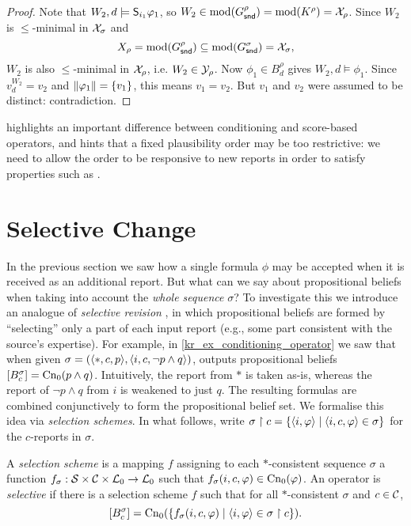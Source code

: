 \begin{proof}
    Note that $W_2, d \models \S_{i_1}{\phi_1}$, so $W_2 \in \mods(G^\rho_\snd)
    = \mods(K^\rho) = \X_\rho$. Since $W_2$ is $\le$-minimal in $\X_\sigma$ and
    \[
        X_\rho = \mods(G^\rho_\snd) \subseteq \mods(G^\sigma_\snd) = \X_\sigma,
    \]
    $W_2$ is also $\le$-minimal in $\X_\rho$, i.e. $W_2 \in \Y_\rho$. Now
    $\phi_1 \in B^\rho_d$ gives $W_2, d \models \phi_1$. Since $v^{W_2}_d =
    v_2$ and $\propmods{\phi_1} = \{v_1\}$, this means $v_1 = v_2$. But $v_1$
    and $v_2$ were assumed to be distinct: contradiction.

\end{proof}

 highlights an important
difference between conditioning and score-based operators, and hints that
a fixed plausibility order may be too restrictive: we
need to allow the order to be responsive to new reports in order to satisfy
properties such as \strongcondsucc{}.

\section{Selective Change}
\label{kr_sec_selective_change}

In the previous section we saw how a single formula $\phi$ may be accepted when
it is received as an additional report. But what can we say about propositional
beliefs when taking into account the \emph{whole sequence} $\sigma$? To
investigate this we introduce an analogue of \emph{selective revision}
\cite{ferme1999selective}, in which propositional beliefs are formed by
``selecting'' only a part of each input report (e.g., some part consistent with
the source's expertise).
%
For example, in \cref{kr_ex_conditioning_operator} we saw that when given
$\sigma = (\tuple{\ast, c, p}, \tuple{i, c, \neg{p} \land q})$, \varbasedcond{}
outputs propositional beliefs $\proppart{B^\sigma_c} = \cnprop(p \land q)$.
Intuitively, the report from $\ast$ is taken as-is, whereas the report of
$\neg{p} \land q$ from $i$ is weakened to just $q$. The resulting formulas are
combined conjunctively to form the propositional belief set.
%
We formalise this idea via \emph{selection schemes}. In what follows, write
$\sigma \rs c = \{\tuple{i, \phi} \mid \tuple{i, c, \phi} \in \sigma\}$ for the
$c$-reports in $\sigma$.

\begin{definition}
    \label{kr_def_selectivity}
    A \emph{selection scheme} is a mapping $f$ assigning to each
    $\ast$-consistent sequence $\sigma$ a function $f_\sigma: \srcs \times \C
    \times \lprop \to \lprop$ such that $f_\sigma(i, c, \phi) \in
    \cnprop(\phi)$.
    An operator is \emph{selective} if there is a selection scheme $f$ such
    that for all $\ast$-consistent $\sigma$ and $c \in \C$,
    \[
        \proppart{B^\sigma_c} = \cnprop(\{f_\sigma(i, c, \phi) \mid \tuple{i,
        \phi} \in \sigma \rs c\}).
    \]
\end{definition}

